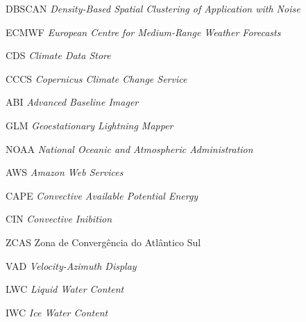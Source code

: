\begin{siglas}
  \item[DBSCAN] \textit{Density-Based Spatial Clustering of Application with Noise}
  \item[ECMWF] \textit{European Centre for Medium-Range Weather Forecasts}
  \item[CDS] \textit{Climate Data Store}
  \item[CCCS] \textit{Copernicus Climate Change Service}
  \item[ABI] \textit{Advanced Baseline Imager}
  \item[GLM] \textit{Geoestationary Lightning Mapper}
  \item[NOAA] \textit{National Oceanic and Atmospheric Administration}
  \item[AWS] \textit{Amazon Web Services}
  \item[CAPE] \textit{Convective Available Potential Energy}
  \item[CIN] \textit{Convective Inibition}
  \item[ZCAS] Zona de Convergência do Atlântico Sul
  \item[VAD] \textit{Velocity-Azimuth Display}
  \item[LWC] \textit{Liquid Water Content}
  \item[IWC] \textit{Ice Water Content}
\end{siglas}
